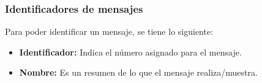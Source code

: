 %

\subsubsection{Identificadores de mensajes} 

Para poder identificar un mensaje, se tiene lo siguiente:
\begin{itemize}
	\item \textbf{Identificador:} Indica el número asignado para el mensaje.
	\item \textbf{Nombre:} Es un resumen de lo que el mensaje realiza/muestra.
\end{itemize}

